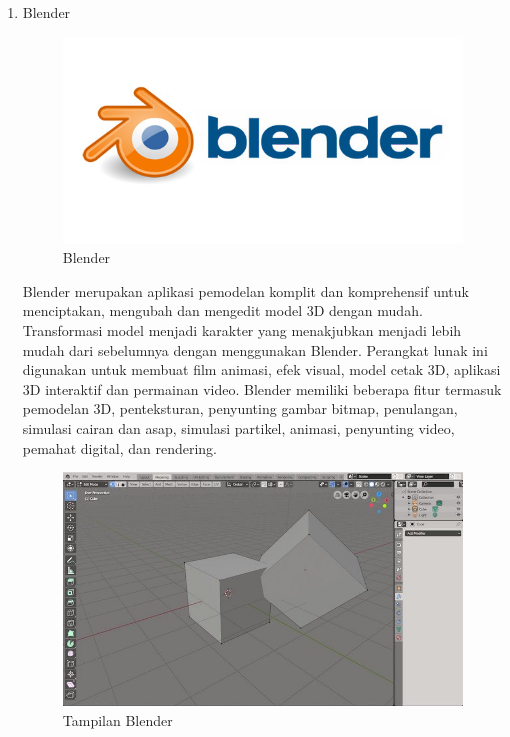 \begin{enumerate}
\item Blender
\begin{figure}[H]
\centering
\includegraphics[width=1\textwidth]{figures/blender1.jpg}
\caption{Blender}
\label{print}
\end{figure}
\par Blender merupakan aplikasi pemodelan komplit dan komprehensif untuk menciptakan, mengubah dan mengedit model 3D dengan mudah. Transformasi model menjadi karakter yang menakjubkan menjadi lebih mudah dari sebelumnya dengan menggunakan Blender. Perangkat lunak ini digunakan untuk membuat film animasi, efek visual, model cetak 3D, aplikasi 3D interaktif dan permainan video. Blender memiliki beberapa fitur termasuk pemodelan 3D, penteksturan, penyunting gambar bitmap, penulangan, simulasi cairan dan asap, simulasi partikel, animasi, penyunting video, pemahat digital, dan rendering.
\begin{figure}[H]
\centering
\includegraphics[width=1\textwidth]{figures/blender2.jpg}
\caption{Tampilan Blender}
\label{print}
\end{figure}


\end{enumerate}
